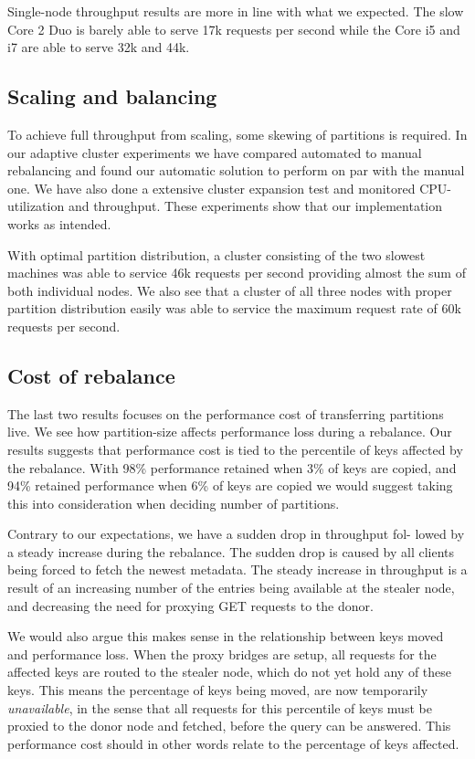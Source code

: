 Single-node throughput results are more in line with what we expected. The slow Core 2 Duo is barely able to serve 17k requests per second while the Core i5 and i7 are able to serve 32k and 44k. 

\subsection{Scaling and balancing}
\label{eval:balance}
To achieve full throughput from scaling, some skewing of partitions is required. In our adaptive cluster experiments we have compared automated to manual rebalancing and found our automatic solution to perform on par with the manual one. We have also done a extensive cluster expansion test and monitored CPU-utilization and throughput. These experiments show that our implementation works as intended. 

With optimal partition distribution, a cluster consisting of the two slowest machines was able to service 46k requests per second providing almost the sum of both individual nodes. We also see that a cluster of all three nodes with proper partition distribution easily was able to service the maximum request rate of 60k requests per second. 

\subsection{Cost of rebalance}
The last two results focuses on the performance cost of transferring partitions live. We see how partition-size affects performance loss during a rebalance. Our results suggests that performance cost is tied to the percentile of keys affected by the rebalance. With 98\% performance retained when 3\% of keys are copied, and 94\% retained performance when 6\% of keys are copied we would suggest taking this into consideration when deciding number of partitions.

Contrary to our expectations, we have a sudden drop in throughput fol- lowed by a steady increase during the rebalance. The sudden drop is caused by all clients being forced to fetch the newest metadata. The steady increase in throughput is a result of an increasing number of the entries being available at the stealer node, and decreasing the need for proxying GET requests to the donor.

We would also argue this makes sense in the relationship between keys moved and performance loss.
When the proxy bridges are setup, all requests for the affected keys are routed to the stealer node, which do not yet hold any of these keys. 
This means the percentage of keys being moved, are now temporarily \emph{unavailable}, in the sense that all requests for this percentile of keys must be proxied to the donor node and fetched, before the query can be answered. This performance cost should in other words relate to the percentage of keys affected.

